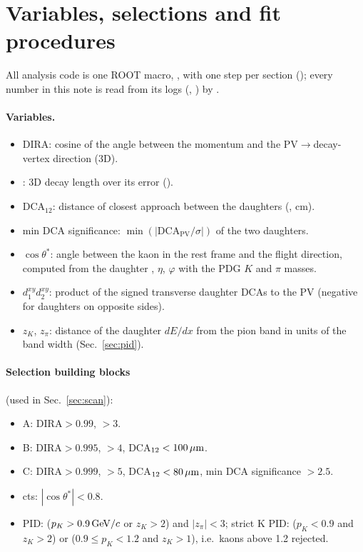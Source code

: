 \section{Variables, selections and fit procedures}
\label{sec:method}

All analysis code is one ROOT macro, , with one step per section
(); every number in this note is read from its logs (,
) by .

\paragraph{Variables.}
\begin{itemize}
\item DIRA: cosine of the angle between the \Dzero{} momentum and the PV$\to$decay-vertex direction (3D).
\item \Ls: 3D decay length over its error ().
\item DCA$_{12}$: distance of closest approach between the daughters (, cm).
\item min DCA significance: $\min(|\mathrm{DCA}_\mathrm{PV}/\sigma|)$ of the two daughters.
\item $\cos\theta^*$: angle between the kaon in the \Dzero{} rest frame and the \Dzero{} flight direction, computed from the
  daughter \pt, $\eta$, $\varphi$ with the PDG $K$ and $\pi$ masses.
\item $d_1^{xy}d_2^{xy}$: product of the signed transverse daughter DCAs to the PV (negative for daughters on opposite sides).
\item $z_K$, $z_\pi$: distance of the daughter $dE/dx$ from the pion band in units of the band width (Sec.~\ref{sec:pid}).
\end{itemize}

\paragraph{Selection building blocks} (used in Sec.~\ref{sec:scan}):
\begin{itemize}
\item A: DIRA$>0.99$, \Ls$>3$.
\item B: DIRA$>0.995$, \Ls$>4$, DCA$_{12}<100\,\mu\mathrm{m}$.
\item C: DIRA$>0.999$, \Ls$>5$, DCA$_{12}<80\,\mu\mathrm{m}$, min DCA significance $>2.5$.
\item cts: $|\cos\theta^*|<0.8$.
\item PID: ($p_K>0.9\,\mathrm{GeV}/c$ or $z_K>2$) and $|z_\pi|<3$; strict K PID: ($p_K<0.9$ and $z_K>2$) or ($0.9\le p_K<1.2$ and
  $z_K>1$), i.e.\ kaons above 1.2\gevc{} rejected.
\end{itemize}

